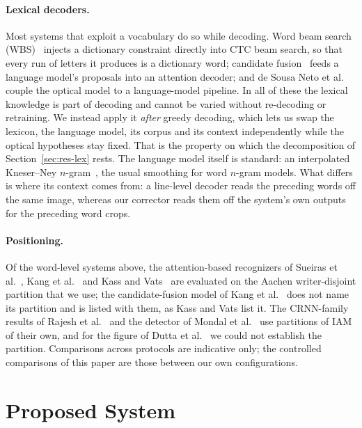 \documentclass{ws-ijprai}
\begin{document}
\paragraph{Lexical decoders.}
Most systems that exploit a vocabulary do so while decoding. Word beam
search (WBS)~\cite{scheidl2018wbs} injects a dictionary constraint
directly into CTC beam search, so that every run of letters it produces
is a dictionary word; candidate fusion~\cite{kang2021candidate} feeds a language
model's proposals into an attention decoder; and de Sousa Neto et
al.~\cite{flor2020htrflor} couple the optical model to a
language-model pipeline. In all of these the lexical knowledge is part
of decoding and cannot be varied without re-decoding or retraining. We
instead apply it \emph{after} greedy decoding, which lets us swap the
lexicon, the language model, its corpus and its context independently
while the optical hypotheses stay fixed. That is the property on which
the decomposition of Section~\ref{sec:res-lex} rests. The language
model itself is standard: an interpolated Kneser--Ney
$n$-gram~\cite{kneser1995improved, chen1999empirical}, the usual
smoothing for word $n$-gram models. What differs is where its context
comes from: a line-level decoder reads the preceding words off the same
image, whereas our corrector reads them off the system's own outputs
for the preceding word crops.

\paragraph{Positioning.}
Of the word-level systems above, the attention-based recognizers
of Sueiras et al.~\cite{sueiras2018offline}, Kang et
al.~\cite{kang2018convolve} and Kass and
Vats~\cite{kass2022attentionhtr} are evaluated on the Aachen
writer-disjoint partition that we use; the candidate-fusion model of Kang
et al.~\cite{kang2021candidate} does not name its partition and is listed
with them, as Kass and Vats list it. The CRNN-family results of
Rajesh et al.~\cite{rajesh2022hwrcnet} and the detector of Mondal et
al.~\cite{mondal2022yolo} use partitions of IAM of their own, and for the
figure of Dutta et al.~\cite{dutta2018improving} we could not establish the
partition.
Comparisons across protocols are indicative only; the controlled
comparisons of this paper are those between our own configurations.

\section{Proposed System}
\label{sec:method}
\end{document}
